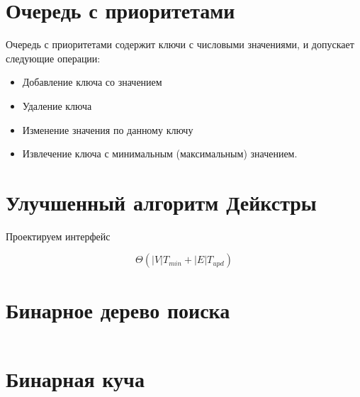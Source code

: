 \documentclass[24pt,pdf,hyperref={unicode},aspectratio=169]{beamer}
\begin{document}
\section{Очередь с приоритетами}

\begin{frame}
Очередь с приоритетами содержит ключи с числовыми значениями, и допускает следующие операции: 
\begin{itemize}
\item Добавление ключа со значением
\item Удаление ключа 
\item Изменение значения по данному ключу
\item Извлечение ключа с минимальным (максимальным) значением.
\end{itemize}
\end{frame}

\section{Улучшенный алгоритм Дейкстры}

\begin{frame}
Проектируем интерфейс
\end{frame}

\begin{frame}
\begin{huge}
$$
\Theta\left(|V|T_{min} + |E|T_{upd}\right)
$$
\end{huge}
\end{frame}

\section{Бинарное дерево поиска}

\begin{frame}
\begin{columns}
\begin{center}
\begin{tikzpicture}

\end{tikzpicture}
\end{center}
\end{columns}
\end{frame}

\section{Бинарная куча}
\end{document}
